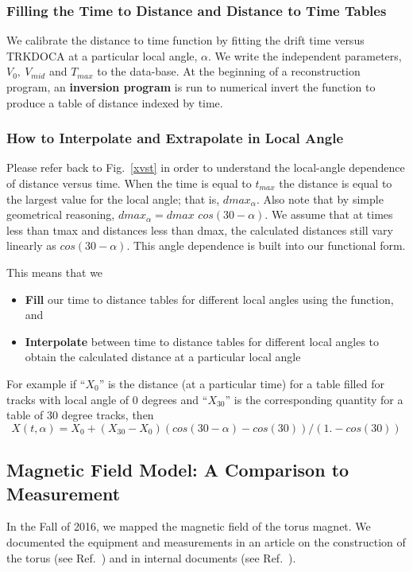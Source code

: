 \subsubsection{Filling the Time to Distance and Distance to Time Tables}
We calibrate the distance to time function by fitting the drift time versus
TRKDOCA at a particular local angle, $\alpha$.  We write the independent parameters,
$V_0, ~V_{mid}$ and $T_{max}$ to the data-base.  At the beginning of a reconstruction program,
an {\bf inversion program} is run to numerical invert the function to produce a table
of distance indexed by time.


\subsubsection{How to Interpolate and Extrapolate in Local Angle}
Please refer back to Fig.~\ref{xvst} in order to understand the local-angle dependence
of distance versus time.  When the time is equal to $t_{max}$ the distance is equal to
the largest value for the local angle; that is, $dmax_{\alpha}$.  Also note that by
simple geometrical reasoning, $dmax_{\alpha} = dmax$  $cos(30-\alpha)$.
We assume that at times less than tmax and distances less than dmax, the calculated
distances still vary linearly as $cos(30-\alpha)$.  This angle dependence is built into
our functional form.

This means that we
\begin{itemize}
\item {\bf Fill} our time to distance tables for different local angles using the function, and
\item {\bf Interpolate} between time to distance tables for different local angles to obtain
the calculated distance at a particular local angle
\end{itemize}
For example if ``$X_0$'' is the distance (at a particular time) for a table filled for tracks with local angle of 0 degrees
and ``$X_{30}$'' is the corresponding quantity for a table of 30 degree tracks, then
\begin{equation} 
\label{eq-extrap30}
X(t,\alpha) = X_0 + (X_{30}-X_0) (cos(30-\alpha) - cos(30)) / (1. - cos(30))
\end{equation}

\subsection{Magnetic Field Model: A Comparison to Measurement}
In the Fall of 2016, we mapped the magnetic field of the torus magnet.
We documented the equipment and measurements in an article on the
construction of the torus (see Ref.~\cite{torus-ieee}) and in internal
documents (see Ref.~\cite{magmapping}).

